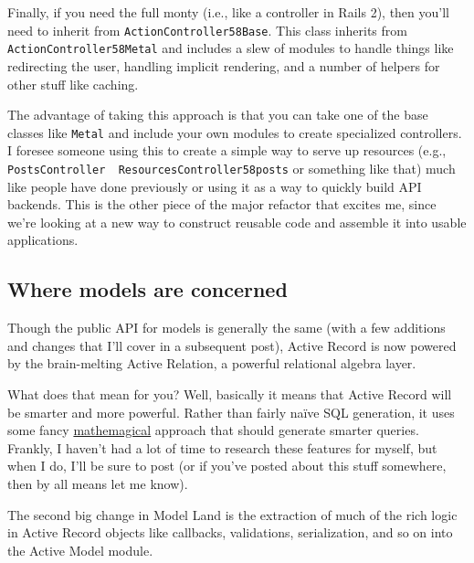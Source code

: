 \documentclass{book}
\begin{document}
Finally, if you need the full monty (i.e., like a controller in Rails 2), then you'{}ll need to inherit from {\colorbox[rgb]{0.87,0.87,0.87}{\tt ActionController\char58Base}}. This class inherits from {\colorbox[rgb]{0.87,0.87,0.87}{\tt ActionController\char58Metal}} and includes a slew of modules to handle things like redirecting the user, handling implicit rendering, and a number of helpers for other stuff like caching.

The advantage of taking this approach is that you can take one of the base classes like {\colorbox[rgb]{0.87,0.87,0.87}{\tt Metal}} and include your own modules to create specialized controllers. I foresee someone using this to create a simple way to serve up resources (e.g., {\colorbox[rgb]{0.87,0.87,0.87}{\tt PostsController~~ResourcesController\char58posts}} or something like that) much like people have done previously or using it as a way to quickly build API backends. This is the other piece of the major refactor that excites me, since we'{}re looking at a new way to construct reusable code and assemble it into usable applications.

\hypertarget{where_models_are_concerned}{}\subsection*{{Where models are concerned}}\label{where_models_are_concerned}

Though the public API for models is generally the same (with a few additions and changes that I'{}ll cover in a subsequent post), Active Record is now powered by the brain-melting Active Relation, a powerful relational algebra layer.



What does that mean for you? Well, basically it means that Active Record will be smarter and more powerful. Rather than fairly naïve SQL generation, it uses some fancy \href{http://db.grussell.org/section010.html}{mathemagical} approach that should generate smarter queries. Frankly, I haven'{}t had a lot of time to research these features for myself, but when I do, I'{}ll be sure to post (or if you'{}ve posted about this stuff somewhere, then by all means let me know).

The second big change in Model Land is the extraction of much of the rich logic in Active Record objects like callbacks, validations, serialization, and so on into the Active Model module.
\end{document}
